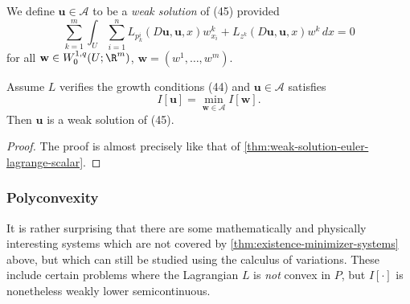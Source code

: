 \begin{definition}
\label{def:weak-solution-euler-lagrange-system}
We define $\mathbf{u} \in \mathcal{A}$ to be a \textit{weak solution} of (45) provided
\[
\sum_{k=1}^m \int_U \sum_{i=1}^n L_{p_k^i}(D\mathbf{u}, \mathbf{u}, x)w^k_{x_i} + L_{z^k}(D\mathbf{u}, \mathbf{u}, x)w^k \, dx = 0
\]
for all $\mathbf{w} \in W_0^{1,q}(U; \R^m)$, $\mathbf{w} = (w^1, \ldots, w^m)$.
\end{definition}

\begin{theorem}
\label{thm:weak-solution-euler-lagrange-system}
Assume $L$ verifies the growth conditions (44) and $\mathbf{u} \in \mathcal{A}$ satisfies
\[
I[\mathbf{u}] = \min_{\mathbf{w} \in \mathcal{A}} I[\mathbf{w}].
\]
Then $\mathbf{u}$ is a weak solution of (45).
\end{theorem}
\begin{proof}
The proof is almost precisely like that of \cref{thm:weak-solution-euler-lagrange-scalar}.
\end{proof}

\subsubsection{Polyconvexity}

It is rather surprising that there are some mathematically and physically interesting systems which are not covered by \cref{thm:existence-minimizer-systems} above, but which can still be studied using the calculus of variations. These include certain problems where the Lagrangian $L$ is \textit{not} convex in $P$, but $I[\cdot]$ is nonetheless weakly lower semicontinuous.

